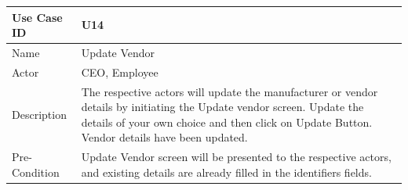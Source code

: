 \documentclass[12pt,a4paper]{report}
\begin{document}
\begin{tabular}{ | m{3cm} | m{12cm}| } \hline

Use Case ID &  U14 \\\hline

Name  	    &  Update Vendor\\ \hline

Actor     	& CEO, Employee \\ \hline

Description &  The respective actors will update the manufacturer or vendor details by initiating the Update vendor screen. Update the details of your own choice and then click on Update Button. Vendor details have been updated. \\ \hline

Pre-Condition &  Update Vendor screen will be presented to the respective actors, and existing details are already filled in the identifiers fields. \\ \hline
\end{tabular}
\end{document}
